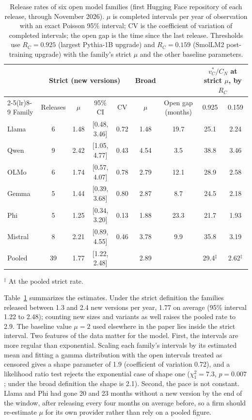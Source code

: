 \documentclass[ijds,blindrev]{informs4}
\begin{document}
\begin{table}[t]
\centering
\caption{Release rates of six open model families (first Hugging Face repository of each release, through November 2026). $\mu$ is completed intervals per year of observation with an exact Poisson 95\% interval; CV is the coefficient of variation of completed intervals; the open gap is the time since the last release. Thresholds use $R_C=0.925$ (largest Pythia-1B upgrade) and $R_C=0.159$ (SmolLM2 post-training upgrade) with the family's strict $\mu$ and the other baseline parameters.}\label{tab:releases}
\small
\begin{tabular}{lcccccccc}
\toprule
 & \multicolumn{4}{c}{Strict (new versions)} & Broad & & \multicolumn{2}{c}{$v^*_C/C_N$ at strict $\mu$, by $R_C$}\\
\cmidrule(lr){2-5}\cmidrule(lr){8-9}
Family & Releases & $\mu$ & 95\% CI & CV & $\mu$ & Open gap (months) & 0.925 & 0.159\\
\midrule
Llama & 6 & 1.48 & [0.48, 3.46] & 0.72 & 1.48 & 19.7 & 25.1 & 2.24\\
Qwen & 9 & 2.42 & [1.05, 4.77] & 0.43 & 4.54 & 3.5 & 38.8 & 3.46\\
OLMo & 6 & 1.74 & [0.57, 4.07] & 0.78 & 2.79 & 12.1 & 28.9 & 2.58\\
Gemma & 5 & 1.44 & [0.39, 3.68] & 0.80 & 2.87 & 8.7 & 24.5 & 2.18\\
Phi & 5 & 1.25 & [0.34, 3.20] & 0.13 & 1.88 & 23.3 & 21.7 & 1.93\\
Mistral & 8 & 2.21 & [0.89, 4.55] & 0.46 & 3.78 & 9.9 & 35.8 & 3.19\\
\midrule
Pooled & 39 & 1.77 & [1.22, 2.48] & & 2.89 & & 29.4$^\ddagger$ & 2.62$^\ddagger$\\
\bottomrule
\end{tabular}

\smallskip\footnotesize $^\ddagger$ At the pooled strict rate.
\end{table}

Table~\ref{tab:releases} summarizes the estimates. Under the strict definition the families released between 1.3 and 2.4 new versions per year, 1.77 on average (95\% interval 1.22 to 2.48); counting new sizes and variants as well raises the pooled rate to 2.9. The baseline value $\mu=2$ used elsewhere in the paper lies inside the strict interval. Two features of the data matter for the model. First, the intervals are more regular than exponential. Scaling each family's intervals by its estimated mean and fitting a gamma distribution with the open intervals treated as censored gives a shape parameter of 1.9 (coefficient of variation 0.72), and a likelihood ratio test rejects the exponential case of shape one ($\chi^2_1=7.3$, $p=0.007$; under the broad definition the shape is 2.1). Second, the pace is not constant. Llama and Phi had gone 20 and 23 months without a new version by the end of the window, after releasing every four months on average before, so a firm should re-estimate $\mu$ for its own provider rather than rely on a pooled figure.
\end{document}
